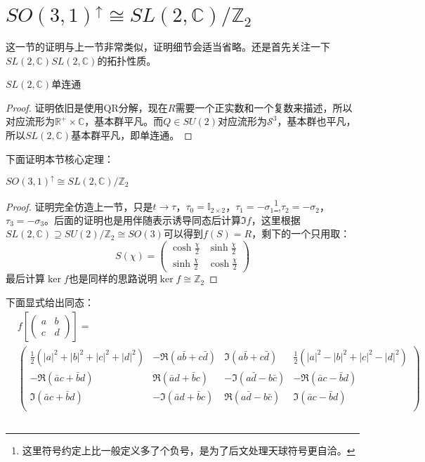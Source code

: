 \section{$SO(3,1)^\uparrow\cong SL(2,\mathbb{C})/\mathbb{Z}_2$}
这一节的证明与上一节非常类似，证明细节会适当省略。还是首先关注一下$SL(2,\mathbb{C})$$SL(2,\mathbb{C})$的拓扑性质。
\begin{lemma}
	$SL(2,\mathbb{C})$单连通
\end{lemma}
\begin{proof}
	证明依旧是使用QR分解，现在$R$需要一个正实数和一个复数来描述，所以对应流形为$\mathbb{R}^+\times\mathbb{C}$，基本群平凡。而$Q\in SU(2)$对应流形为$\mathcal{S}^3$，基本群也平凡，所以$SL(2,\mathbb{C})$基本群平凡，即单连通。
\end{proof}
下面证明本节核心定理：
\begin{theorem}
	$SO(3,1)^\uparrow\cong SL(2,\mathbb{C})/\mathbb{Z}_2$
\end{theorem}
\begin{proof}
	证明完全仿造上一节，只是$t\to\tau$，$\tau_0=\mathbb{I}_{2\times 2}$，$\tau_1=-\sigma_1$\footnote{这里符号约定上比一般定义多了个负号，是为了后文处理天球符号更自洽。},$\tau_2=-\sigma_2$，$\tau_3=-\sigma_3$。后面的证明也是用伴随表示诱导同态后计算$\Im f$，这里根据$SL(2,\mathbb{C})\supseteq SU(2)/\mathbb{Z}_2\cong SO(3)$可以得到$f(S)=R$，剩下的一个只用取：
	\[S(\chi)=\begin{pmatrix}
		\cosh\frac{\chi}{2} &\sinh\frac{\chi}{2} \\
		\sinh\frac{\chi}{2} &\cosh\frac{\chi}{2} 
	\end{pmatrix}\]
	最后计算$\ker f$也是同样的思路说明$\ker f\cong\mathbb{Z}_2$
\end{proof}
\begin{remark}
	下面显式给出同态：
	\begin{equation}
		\begin{aligned}
		&f\left[\begin{pmatrix}
			a &b \\
			c&d
		\end{pmatrix}\right]=\\
		&\begin{pmatrix}
			\frac{1}{2}\left(|a|^2+|b|^2+|c|^2+|d|^2\right) &-\Re(a\bar b +c\bar d) &\Im(a\bar b +c\bar d)&\frac{1}{2}\left(|a|^2-|b|^2+|c|^2-|d|^2\right)\\
			-\Re(\bar ac +\bar bd)&\Re(\bar ad +\bar bc)&-\Im(a\bar d- b\bar c)&-\Re(\bar ac -\bar bd)\\
			\Im(\bar ac +\bar bd)&-\Im(\bar ad +\bar bc)&\Re(a\bar d- b\bar c)&\Im(\bar ac -\bar bd)\\

\end{pmatrix}
\end{aligned}
\end{equation}
\end{remark}$$
